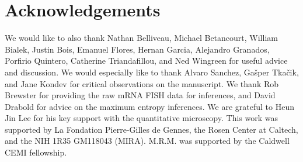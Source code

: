 \section*{Acknowledgements}

We would like to also thank Nathan Belliveau, Michael Betancourt, William
Bialek, Justin Bois, Emanuel Flores, Hernan Garcia, Alejandro Granados,
Porfirio Quintero,  Catherine Triandafillou, and Ned Wingreen for useful advice
and discussion. We would especially like to thank Alvaro Sanchez, Gašper
Tkačik, and Jane Kondev for critical observations on the manuscript. We thank
Rob Brewster for providing the raw mRNA FISH data for inferences, and David
Drabold for advice on the maximum entropy inferences. We are grateful to Heun
Jin Lee for his key support with the quantitative microscopy. This work was
supported by La Fondation Pierre-Gilles de Gennes, the Rosen Center at Caltech,
and the NIH 1R35 GM118043 (MIRA). M.R.M. was supported by the Caldwell CEMI
fellowship. 